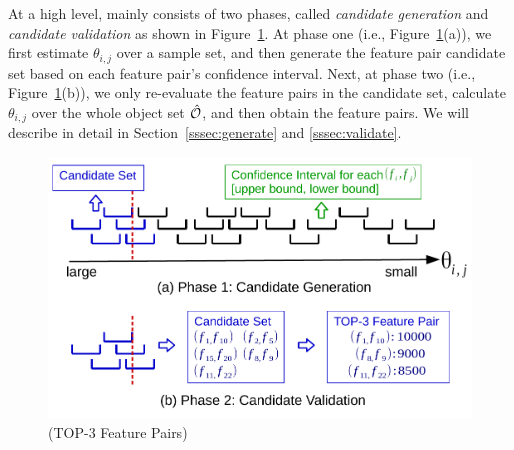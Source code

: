  At a high level, \sampling mainly consists of two phases, called {\em candidate generation} and {\em candidate validation} as shown in Figure~\ref{fig:sampling}. At phase one (i.e., Figure~\ref{fig:sampling}(a)), we first estimate $\theta_{i,j}$ over a sample set, and then generate the feature pair candidate set based on each feature pair's confidence interval. Next, at phase two (i.e., Figure~\ref{fig:sampling}(b)), we only re-evaluate the feature pairs in the candidate set, calculate $\theta_{i,j}$ over the whole object set $\hat{\oo}$, and then obtain the \topk feature pairs. We will describe in detail in Section~\ref{sssec:generate} and \ref{sssec:validate}.
\begin{figure}[t!]
  \centering
  \vspace{-2mm}
  \includegraphics[width=\linewidth]{fig/sampling.pdf}
  \vspace{-6mm}
\caption{\sampling (TOP-3 Feature Pairs)}
\label{fig:sampling}
\end{figure} 
